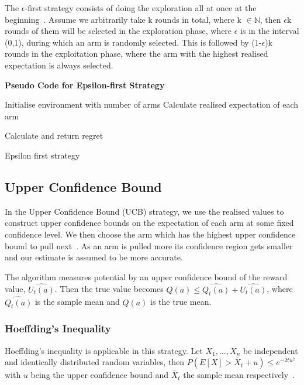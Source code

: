 The $\epsilon$-first strategy consists of doing the exploration all at once at the beginning~\citep{vermorel}.
Assume we arbitrarily take k rounds in total, where k $\in \mathbb{N}$, then $\epsilon$k rounds of them will be selected in the exploration phase, where $\epsilon$ is in the interval (0,1), during which an arm is randomly selected.
This is followed by (1-$\epsilon$)k rounds in the exploitation phase, where the arm with the highest realised expectation is always selected.
\par
\textbf{Pseudo Code for Epsilon-first Strategy}
\newline
\begin{algorithm}[H]
    Initialise environment with number of arms\;
    Calculate realised expectation of each arm\;

    Calculate and return regret
    \caption{Epsilon first strategy}\label{alg:epsilon_algorithm}
\end{algorithm}

\subsection{Upper Confidence Bound}\label{subsec:upper-confidence-bound}
In the Upper Confidence Bound (UCB) strategy, we use the realised values to construct upper confidence bounds on the expectation of each arm at some fixed confidence level.
We then choose the arm which has the highest upper confidence bound to pull next~\citep{SVGarbar2012}.
As an arm is pulled more its confidence region gets smaller and our estimate is assumed to be more accurate.

The algorithm measures potential by an upper confidence bound of the reward value, $\widehat{U_t (a)}$.
Then the true value becomes $ Q(a)  \leq \widehat{Q_t (a)}+\widehat{U_t (a)} $, where  $ \widehat{Q_t (a)}$ is the sample mean and $ Q(a)$ is the true mean.

\subsubsection{Hoeffding’s Inequality}
Hoeffding's inequality is applicable in this strategy.
Let $X_1, \dots, X_n$ be independent and identically distributed random variables, then $ P(E[X] > \overline  X_t + u) \leq e^{-2t u^2}$ with $u$ being the upper confidence bound and $ \overline X_t $ the sample mean respectively~\citep{Hoeffding1963}.

